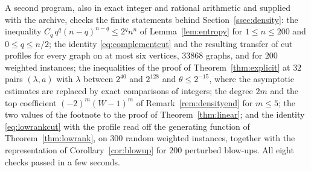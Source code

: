 A second program, also in exact integer and rational arithmetic and supplied
with the archive, checks the finite statements behind Section~\ref{ssec:density}:
the inequality $C_q\,q^q(n-q)^{n-q}\le2^qn^n$ of Lemma~\ref{lem:entropy} for
$1\le n\le200$ and $0\le q\le n/2$; the identity \eqref{eq:complementcut} and the
resulting transfer of cut profiles for every graph on at most six vertices, $33868$
graphs, and for $200$ weighted instances; the inequalities of the proof of
Theorem~\ref{thm:explicit} at $32$ pairs $(\lambda,a)$ with $\lambda$ between $2^{40}$
and $2^{128}$ and $\theta\le2^{-15}$, where the asymptotic estimates are replaced
by exact comparisons of integers; the degree $2m$ and the top coefficient
$(-2)^m(W-1)^m$ of Remark~\ref{rem:densityend} for $m\le5$; the two values of
the footnote to the proof of Theorem~\ref{thm:linear}; and the identity
\eqref{eq:lowrankcut} with the profile read off the generating function of
Theorem~\ref{thm:lowrank}, on $300$ random weighted instances, together with the
representation of Corollary~\ref{cor:blowup} for $200$ perturbed blow-ups. All eight
checks passed in a few seconds.

